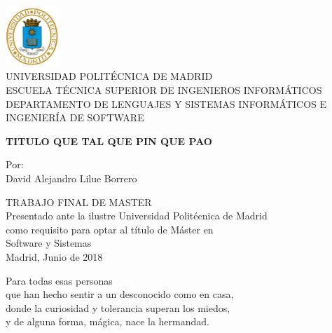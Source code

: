 \documentclass[12pt,letterpaper,titlepage,oneside,openright]{book}
\begin{document}
\frontmatter

\begin{titlepage}
    \begin{center}
        \includegraphics[width=0.15\textwidth]{logo.png}\\
        {\large UNIVERSIDAD POLITÉCNICA DE MADRID}\\
        ESCUELA TÉCNICA SUPERIOR DE INGENIEROS INFORMÁTICOS\\
        DEPARTAMENTO DE LENGUAJES Y SISTEMAS INFORMÁTICOS E INGENIERÍA DE SOFTWARE

        \vspace{6em}

        \textbf{TITULO QUE TAL QUE PIN QUE PAO}

        \vspace{6em}

        Por:\\
        David Alejandro Lilue Borrero\\

        \vspace{6em}

        TRABAJO FINAL DE MASTER\\
        Presentado ante la ilustre Universidad Politécnica de Madrid\\
        como requisito para optar al título de Máster en\\
        Software y Sistemas\\
        
        \vfill
        Madrid, Junio de 2018
    \end{center}
\end{titlepage}

\newpage

\cleardoublepage
{}
{}
\begin{flushright}
Para todas esas personas\\
que han hecho sentir a un desconocido como en casa,\\
donde la curiosidad y tolerancia superan los miedos,\\
y de alguna forma, mágica, nace la hermandad.
\end{flushright}
\end{document}
